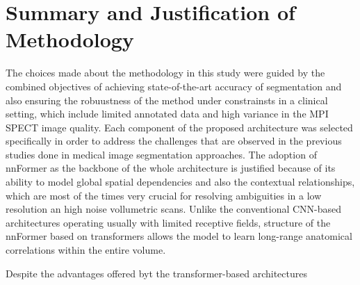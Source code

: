 \section{Summary and Justification of Methodology}
The choices made about the methodology in this study were guided by the combined objectives of achieving state-of-the-art accuracy of segmentation  and also ensuring the robuustness of the method under constrainsts in a clinical setting, which include limited annotated data and high variance in the MPI SPECT image quality. Each component of the proposed architecture was selected specifically in order to address the challenges that are observed in the previous studies done in medical image segmentation approaches. The adoption of nnFormer as the backbone of the whole architecture is justified because of its ability to model global spatial dependencies and also the contextual relationships, which are most of the times very crucial for resolving ambiguities in a low resolution an high noise vollumetric scans. Unlike the conventional CNN-based architectures operating usually with limited receptive fields, structure of the nnFormer based on transformers allows the model to learn long-range anatomical correlations within the entire volume.

Despite the advantages offered byt the transformer-based architectures